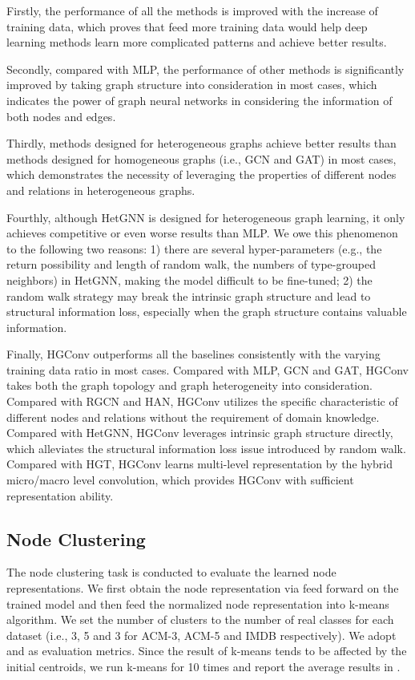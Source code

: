 Firstly, the performance of all the methods is improved with the increase of training data, which proves that feed more training data would help deep learning methods learn more complicated patterns and achieve better results.

Secondly, compared with MLP, the performance of other methods is significantly improved by taking graph structure into consideration in most cases, which indicates the power of graph neural networks in considering the information of both nodes and edges. 

Thirdly, methods designed for heterogeneous graphs achieve better results than methods designed for homogeneous graphs (i.e., GCN and GAT) in most cases, which demonstrates the necessity of leveraging the properties of different nodes and relations in heterogeneous graphs.

Fourthly, although HetGNN is designed for heterogeneous graph learning, it only achieves competitive or even worse results than MLP. We owe this phenomenon to the following two reasons: 1) there are several hyper-parameters (e.g., the return possibility and length of random walk, the numbers of type-grouped neighbors) in HetGNN, making the model difficult to be fine-tuned; 2) the random walk strategy may break the intrinsic graph structure and lead to structural information loss, especially when the graph structure contains valuable information.

Finally, HGConv outperforms all the baselines consistently with the varying training data ratio in most cases. Compared with MLP, GCN and GAT, HGConv takes both the graph topology and graph heterogeneity into consideration. Compared with RGCN and HAN, HGConv utilizes the specific characteristic of different nodes and relations without the requirement of domain knowledge. Compared with HetGNN, HGConv leverages intrinsic graph structure directly, which alleviates the structural information loss issue introduced by random walk. Compared with HGT, HGConv learns multi-level representation by the hybrid micro/macro level convolution, which provides HGConv with sufficient representation ability.

\subsection{Node Clustering}
The node clustering task is conducted to evaluate the learned node representations. We first obtain the node representation via feed forward on the trained model and then feed the normalized node representation into k-means algorithm. We set the number of clusters to the number of real classes for each dataset (i.e., 3, 5 and 3 for ACM-3, ACM-5 and IMDB respectively). We adopt  and  as evaluation metrics. Since the result of k-means tends to be affected by the initial centroids, we run k-means for 10 times and report the average results in .

